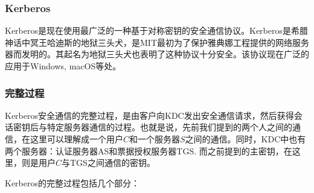\subsubsection{Kerberos}
Kerberos是现在使用最广泛的一种基于对称密钥的安全通信协议。Kerberos是希腊神话中冥王哈迪斯的地狱三头犬，是MIT最初为了保护雅典娜工程提供的网络服务器而发明的。其起名为地狱三头犬也表明了这种协议十分安全。该协议现在广泛的应用于Windows, macOS等处。
\subsubsection{完整过程}
Kerberos安全通信的完整过程，是由客户向KDC发出安全通信请求，然后获得会话密钥后与特定服务器通信的过程。也就是说，先前我们提到的两个人之间的通信，在这里可以理解成一个用户$C$和一个服务器$S$之间的通信。同时，KDC中也有两个服务器：认证服务器AS和票据授权服务器TGS. 而之前提到的主密钥，在这里，则是用户$C$与TGS之间通信的密钥。\par
Kerberos的完整过程包括几个部分：
